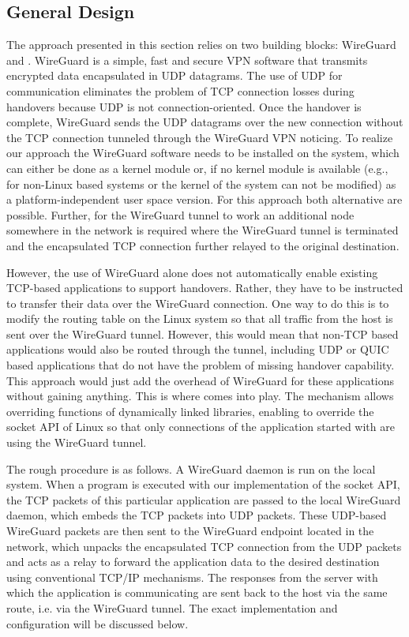 \subsection{General Design}
The approach presented in this section relies on two building blocks: WireGuard and \ld.
WireGuard is a simple, fast and secure VPN software that transmits encrypted data encapsulated in UDP datagrams.
The use of UDP for communication eliminates the problem of TCP connection losses during handovers because UDP is not connection-oriented.
Once the handover is complete, WireGuard sends the UDP datagrams over the new connection without the TCP connection tunneled through the WireGuard VPN noticing.
To realize our approach the WireGuard software needs to be installed on the system, which can either be done as a kernel module or, if no kernel module is available (e.g., for non-Linux based systems or the kernel of the system can not be modified) as a platform-independent user space version.
For this approach both alternative are possible.
Further, for the WireGuard tunnel to work an additional node somewhere in the network is required where the WireGuard tunnel is terminated and the encapsulated TCP connection further relayed to the original destination.

However, the use of WireGuard alone does not automatically enable existing TCP-based applications to support handovers.
Rather, they have to be instructed to transfer their data over the WireGuard connection.
One way to do this is to modify the routing table on the Linux system so that all traffic from the host is sent over the WireGuard tunnel.
However, this would mean that non-TCP based applications would also be routed through the tunnel, including UDP or QUIC based applications that do not have the problem of missing handover capability.
This approach would just add the overhead of WireGuard for these applications without gaining anything.
This is where \ld comes into play.
The \ld mechanism allows overriding functions of dynamically linked libraries, enabling to override the socket API of Linux so that only connections of the application started with \ld are using the WireGuard tunnel.

The rough procedure is as follows.
A WireGuard daemon is run on the local system.
When a program is executed with our \ld implementation of the socket API, the TCP packets of this particular application are passed to the local WireGuard daemon, which embeds the TCP packets into UDP packets.
These UDP-based WireGuard packets are then sent to the WireGuard endpoint located in the network, which unpacks the encapsulated TCP connection from the UDP packets and acts as a relay to forward the application data to the desired destination using conventional TCP/IP mechanisms.
The responses from the server with which the application is communicating are sent back to the host via the same route, i.e. via the WireGuard tunnel.
The exact implementation and configuration will be discussed below.

